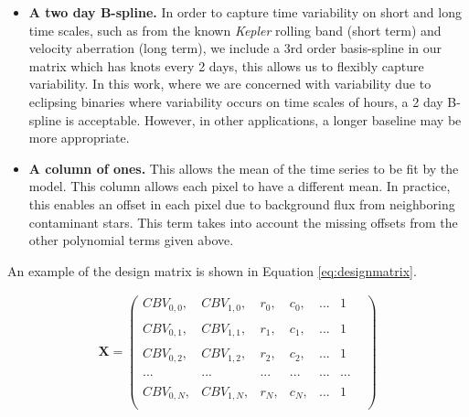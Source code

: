 \documentclass[iop]{emulateapj}
\newcommand{\kepler}{\emph{Kepler}\xspace}
\begin{document}
\begin{itemize}
    \item \textbf{A two day B-spline.} In order to capture time variability on short and long time scales, such as from the known \kepler rolling band (short term) and velocity aberration (long term), we include a 3rd order basis-spline in our matrix which has knots every 2 days, this allows us to flexibly capture variability. In this work, where we are concerned with variability due to eclipsing binaries where variability occurs on time scales of hours, a 2 day B-spline is acceptable. However, in other applications, a longer baseline may be more appropriate.
    \item \textbf{A column of ones.} This allows the mean of the time series to be fit by the model. This column allows each pixel to have a different mean. In practice, this enables an offset in each pixel due to background flux from neighboring contaminant stars. This term takes into account the missing offsets from the other polynomial terms given above.


\end{itemize}

An example of the design matrix is shown in Equation \ref{eq:designmatrix}.

\begin{align}
\label{eq:designmatrix}
\mathbf{X} =\begin{pmatrix}
                CBV_{0,0}, & CBV_{1,0}, & r_0, & c_0, & ... & 1\\
                \\
                CBV_{0,1}, & CBV_{1,1}, & r_1, & c_1, & ... & 1 \\
                \\
                CBV_{0,2}, & CBV_{1,2}, & r_2, & c_2, & ... & 1\\
                \\
                ... & ... & ... & ... & ... & ... &\\
                \\
                CBV_{0,N}, & CBV_{1,N}, & r_N, & c_N, & ... & 1\\
                \end{pmatrix}
\end{align}
\end{document}
